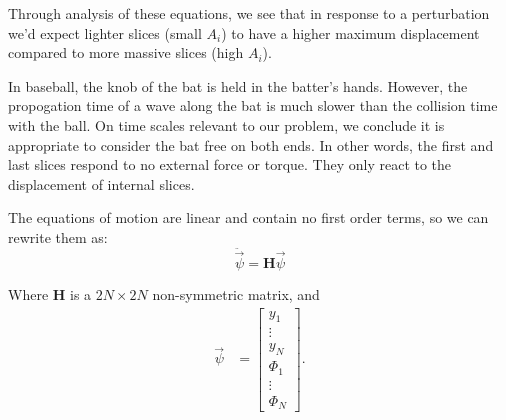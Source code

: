 \documentclass[linenumbers]{aastex7}
\begin{document}
Through analysis of these equations, we see that in response to a perturbation we'd expect lighter slices (small $A_i$) to have a higher maximum displacement compared to more massive slices (high $A_i$).

 In baseball, the knob of the bat is held in the batter's hands. However, the propogation time of a wave along the bat is much slower than the collision time with the ball. On time scales relevant to our problem, we conclude it is appropriate to consider the bat free on both ends. In other words, the first and last slices respond to no external force or torque. They only react to the displacement of internal slices.

The equations of motion are linear and contain no first order terms, so we can rewrite them as:
\begin{equation}
    \ddot{\vec{\psi}} = \mathbf{H}\vec{\psi}
\end{equation}

Where $\mathbf{H}$ is a $2N\times2N$ non-symmetric matrix, and
\begin{align}
    \vec{\psi} &= \begin{bmatrix}
        y_1 \\ \vdots \\ y_N \\ \Phi_1 \\ \vdots \\ \Phi_N  
    \end{bmatrix}.
\end{align}
\end{document}
